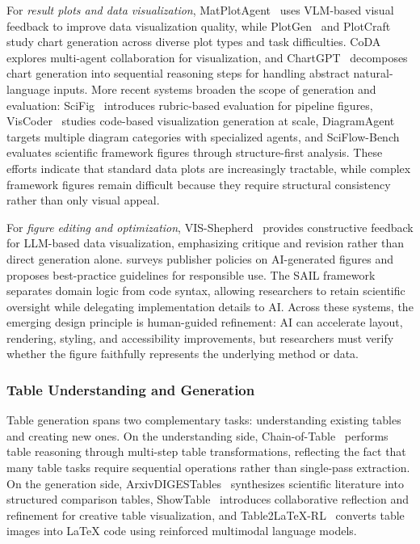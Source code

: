 \documentclass{llmxive}
\begin{document}
For \emph{result plots and data visualization}, MatPlotAgent~\cite{matplotagent2024} uses VLM-based visual feedback to improve data visualization quality, while PlotGen~\cite{plotgen2025} and PlotCraft~\cite{plotcraft2025} study chart generation across diverse plot types and task difficulties. CoDA~\cite{coda2025} explores multi-agent collaboration for visualization, and ChartGPT~\cite{yuan2023chartgpt} decomposes chart generation into sequential reasoning steps for handling abstract natural-language inputs. More recent systems broaden the scope of generation and evaluation: SciFig~\cite{scifig2026} introduces rubric-based evaluation for pipeline figures, VisCoder~\cite{viscoder2025} studies code-based visualization generation at scale, DiagramAgent~\cite{diagramagent2024} targets multiple diagram categories with specialized agents, and SciFlow-Bench~\cite{scifigbench2026} evaluates scientific framework figures through structure-first analysis. These efforts indicate that standard data plots are increasingly tractable, while complex framework figures remain difficult because they require structural consistency rather than only visual appeal.

For \emph{figure editing and optimization}, VIS-Shepherd~\cite{visshepherd2025} provides constructive feedback for LLM-based data visualization, emphasizing critique and revision rather than direct generation alone. \cite{aifigurepolicies2026} surveys publisher policies on AI-generated figures and proposes best-practice guidelines for responsible use. The SAIL framework~\cite{sail2026} separates domain logic from code syntax, allowing researchers to retain scientific oversight while delegating implementation details to AI. Across these systems, the emerging design principle is human-guided refinement: AI can accelerate layout, rendering, styling, and accessibility improvements, but researchers must verify whether the figure faithfully represents the underlying method or data.



\subsubsection{Table Understanding and Generation}
\label{sec:table_gen}

Table generation spans two complementary tasks: understanding existing tables and creating new ones. On the understanding side, Chain-of-Table~\cite{chainoftable2024} performs table reasoning through multi-step table transformations, reflecting the fact that many table tasks require sequential operations rather than single-pass extraction. On the generation side, ArxivDIGESTables~\cite{arxivdigestables2024} synthesizes scientific literature into structured comparison tables, ShowTable~\cite{showtable2025} introduces collaborative reflection and refinement for creative table visualization, and Table2LaTeX-RL~\cite{table2latexrl2025} converts table images into LaTeX code using reinforced multimodal language models.
\end{document}
